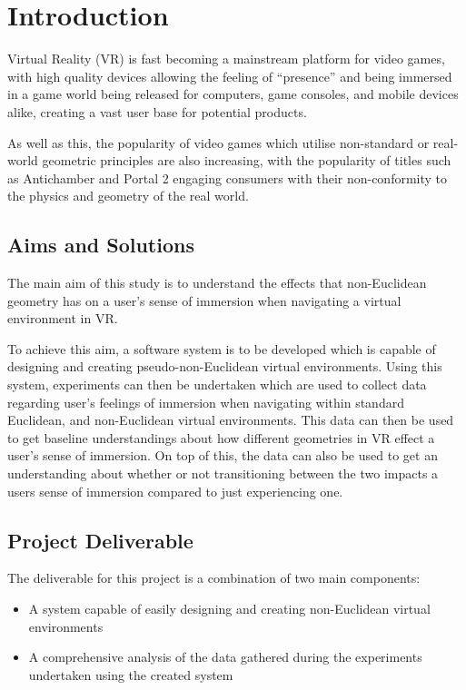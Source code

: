 \chapter{Introduction}
\label{intro}

	Virtual Reality (VR) is fast becoming a mainstream platform for video games, with high quality devices allowing the feeling of \enquote{presence} and being immersed in a game world being released for computers, game consoles, and mobile devices alike, creating a vast user base for potential products.

	As well as this, the popularity of video games which utilise non-standard or real-world geometric principles are also increasing, with the popularity of titles such as Antichamber \cite{Antichamber2013} and Portal 2 \cite{Portal22011} engaging consumers with their non-conformity to the physics and geometry of the real world.

	\section{Aims and Solutions}

		The main aim of this study is to understand the effects that non-Euclidean geometry has on a user's sense of immersion when navigating a virtual environment in VR.

		To achieve this aim, a software system is to be developed which is capable of designing and creating pseudo-non-Euclidean virtual environments.
		Using this system, experiments can then be undertaken which are used to collect data regarding user's feelings of immersion when navigating within standard Euclidean, and non-Euclidean virtual environments.
		This data can then be used to get baseline understandings about how different geometries in VR effect a user's sense of immersion.
		On top of this, the data can also be used to get an understanding about whether or not transitioning between the two impacts a users sense of immersion compared to just experiencing one.

	\section{Project Deliverable}

		The deliverable for this project is a combination of two main components:
		\begin{itemize}
			\item A system capable of easily designing and creating non-Euclidean virtual environments %

			\item A comprehensive analysis of the data gathered during the experiments undertaken using the created system %
		\end{itemize}

